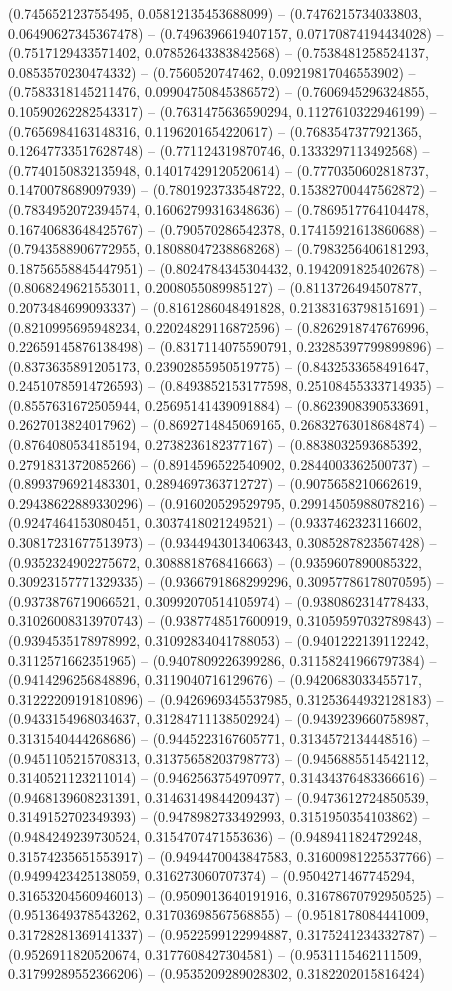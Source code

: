(0.745652123755495, 0.05812135453688099) -- (0.7476215734033803, 0.06490627345367478) -- (0.7496396619407157, 0.07170874194434028) -- (0.7517129433571402, 0.07852643383842568) -- (0.7538481258524137, 0.0853570230474332) -- (0.7560520747462, 0.09219817046553902) -- (0.7583318145211476, 0.09904750845386572) -- (0.7606945296324855, 0.10590262282543317) -- (0.7631475636590294, 0.1127610322946199) -- (0.7656984163148316, 0.1196201654220617) -- (0.7683547377921365, 0.12647733517628748) -- (0.771124319870746, 0.1333297113492568) -- (0.7740150832135948, 0.14017429120520614) -- (0.7770350602818737, 0.1470078689097939) -- (0.7801923733548722, 0.15382700447562872) -- (0.7834952072394574, 0.16062799316348636) -- (0.7869517764104478, 0.16740683648425767) -- (0.790570286542378, 0.17415921613860688) -- (0.7943588906772955, 0.18088047238868268) -- (0.7983256406181293, 0.18756558845447951) -- (0.8024784345304432, 0.1942091825402678) -- (0.8068249621553011, 0.2008055089985127) -- (0.8113726494507877, 0.2073484699093337) -- (0.8161286048491828, 0.21383163798151691) -- (0.8210995695948234, 0.22024829116872596) -- (0.8262918747676996, 0.22659145876138498) -- (0.8317114075590791, 0.23285397799899896) -- (0.8373635891205173, 0.23902855950519775) -- (0.8432533658491647, 0.24510785914726593) -- (0.8493852153177598, 0.25108455333714935) -- (0.8557631672505944, 0.25695141439091884) -- (0.8623908390533691, 0.2627013824017962) -- (0.8692714845069165, 0.26832763018684874) -- (0.8764080534185194, 0.2738236182377167) -- (0.8838032593685392, 0.2791831372085266) -- (0.8914596522540902, 0.2844003362500737) -- (0.8993796921483301, 0.2894697363712727) -- (0.9075658210662619, 0.29438622889330296) -- (0.916020529529795, 0.29914505988078216) -- (0.9247464153080451, 0.3037418021249521) -- (0.9337462323116602, 0.30817231677513973) -- (0.9344943013406343, 0.3085287823567428) -- (0.9352324902275672, 0.3088818768416663) -- (0.9359607890085322, 0.30923157771329335) -- (0.9366791868299296, 0.30957786178070595) -- (0.9373876719066521, 0.30992070514105974) -- (0.9380862314778433, 0.31026008313970743) -- (0.9387748517600919, 0.31059597032789843) -- (0.9394535178978992, 0.31092834041788053) -- (0.9401222139112242, 0.3112571662351965) -- (0.9407809226399286, 0.31158241966797384) -- (0.9414296256848896, 0.3119040716129676) -- (0.9420683033455717, 0.31222209191810896) -- (0.9426969345537985, 0.31253644932128183) -- (0.9433154968034637, 0.31284711138502924) -- (0.9439239660758987, 0.3131540444268686) -- (0.9445223167605771, 0.3134572134448516) -- (0.9451105215708313, 0.31375658203798773) -- (0.9456885514542112, 0.3140521123211014) -- (0.9462563754970977, 0.31434376483366616) -- (0.9468139608231391, 0.31463149844209437) -- (0.9473612724850539, 0.3149152702349393) -- (0.9478982733492993, 0.3151950354103862) -- (0.9484249239730524, 0.3154707471553636) -- (0.9489411824729248, 0.31574235651553917) -- (0.9494470043847583, 0.31600981225537766) -- (0.9499423425138059, 0.316273060707374) -- (0.9504271467745294, 0.31653204560946013) -- (0.9509013640191916, 0.31678670792950525) -- (0.9513649378543262, 0.31703698567568855) -- (0.9518178084441009, 0.31728281369141337) -- (0.9522599122994887, 0.3175241234332787) -- (0.9526911820520674, 0.3177608427304581) -- (0.9531115462111509, 0.31799289552366206) -- (0.9535209289028302, 0.3182202015816424) 